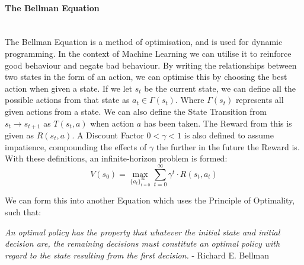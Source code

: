 \begin{flushleft}
                \paragraph{The Bellman Equation} \mbox{} \\
                    \vspace{0.2cm}
                    The Bellman Equation is a method of optimisation, and is used for dynamic programming. In the context of Machine Learning we can utilise it
                    to reinforce good behaviour and negate bad behaviour. By writing the relationships between two states in the form of an action, we can optimise this
                    by choosing the best action when given a state. If we let $s_{t}$ be the current state, we can define all the possible actions from that state as
                    $a_{t} \in \Gamma(s_{t})$. Where $\Gamma(s_{t})$ represents all given actions from a state. We can also define the State Transition from $s_{t} \to s_{t+1}$ 
                    as $T(s_{t}, a)$ when action $a$ has been taken. The Reward from this is given as $R(s_{t}, a)$. A Discount Factor $0 < \gamma < 1$ is also defined to assume
                    impatience, compounding the effects of $\gamma$ the further in the future the Reward is. \\
                    \vspace{0.2cm}
                    With these definitions, an infinite-horizon problem is formed: \\

                    \[ V(s_{0}) = \max_{\{a_{t}\}_{t=0}^{\infty}} \sum_{t=0}^{\infty} \gamma^{t} \cdot R(s_{t},a_{t}) \]
                    \vspace{0.2cm}

                    We can form this into another Equation which uses the Principle of Optimality, such that: \\
                    \vspace{0.2cm}

                    \begin{center}
                        \textit{An optimal policy has the property that whatever the initial state and initial decision are, the remaining decisions must constitute an 
                        optimal policy with regard to the state resulting from the first decision.} - Richard E. Bellman
                    \end{center}
                    \vspace{0.2cm}


\end{flushleft}
